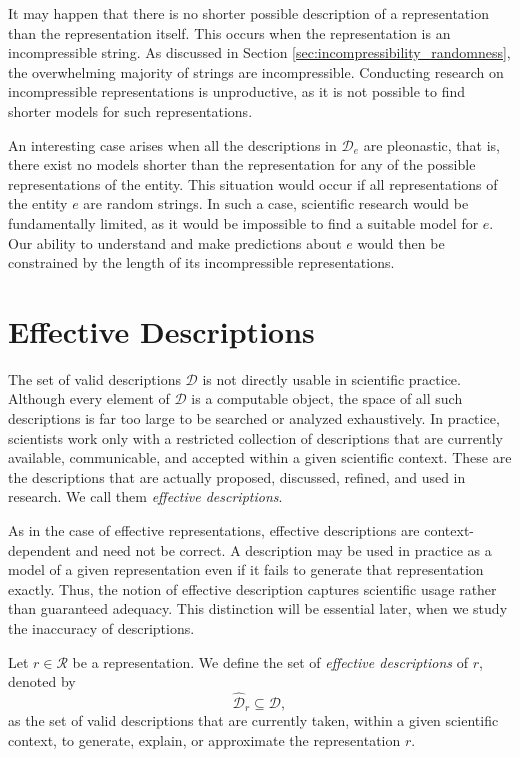 It may happen that there is no shorter possible description of a representation than the representation itself. This occurs when the representation is an incompressible string. As discussed in Section \ref{sec:incompressibility_randomness}, the overwhelming majority of strings are incompressible. Conducting research on incompressible representations is unproductive, as it is not possible to find shorter models for such representations.

An interesting case arises when all the descriptions in $\mathcal{D}_e$ are pleonastic, that is, there exist no models shorter than the representation for any of the possible representations of the entity. This situation would occur if all representations of the entity $e$ are random strings. In such a case, scientific research would be fundamentally limited, as it would be impossible to find a suitable model for $e$. Our ability to understand and make predictions about $e$ would then be constrained by the length of its incompressible representations.

%
%

\section{Effective Descriptions}
\label{sec:effective_descriptions}

The set of valid descriptions \(\mathcal{D}\) is not directly usable in scientific practice. Although
every element of \(\mathcal{D}\) is a computable object, the space of all such descriptions is far too
large to be searched or analyzed exhaustively. In practice, scientists work only with a restricted
collection of descriptions that are currently available, communicable, and accepted within a given
scientific context. These are the descriptions that are actually proposed, discussed, refined, and
used in research. We call them \emph{effective descriptions}.

As in the case of effective representations, effective descriptions are context-dependent and need
not be correct. A description may be used in practice as a model of a given representation even if
it fails to generate that representation exactly. Thus, the notion of effective description captures
scientific usage rather than guaranteed adequacy. This distinction will be essential later, when we
study the inaccuracy of descriptions.

\begin{definition}
Let \(r \in \mathcal{R}\) be a representation. We define the set of \emph{effective descriptions} of \(r\), denoted by
\[
\hat{\mathcal{D}}_r \subseteq \mathcal{D},
\]
as the set of valid descriptions that are currently taken, within a given scientific context, to
generate, explain, or approximate the representation \(r\).
\end{definition}

